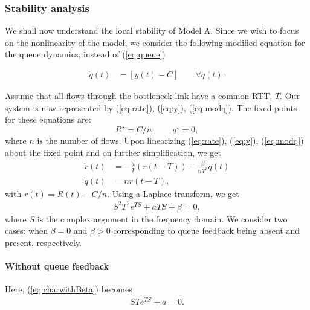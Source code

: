 \documentclass[conference]{IEEEtran}
\begin{document}
\subsubsection{Stability analysis}
We shall now understand the local stability of Model A. Since we wish to focus on the nonlinearity
of the model, we consider the following modified equation for the queue dynamics, instead of (\ref{eq:queue})

\begin{equation}
\label{eq:modq}
\begin{aligned}
\dot{q}\left(t\right) & = \left[y\left(t\right) - C\right] \qquad \forall q\left(t\right).
\end{aligned}
\end{equation}

Assume that all flows through the bottleneck link have a common RTT, $T$. Our system 
is now represented by (\ref{eq:rate}), (\ref{eq:y}), (\ref{eq:modq}). The fixed points for these equations are: 
\begin{equation}
\label{eq:fixedpts}
R^{\star} = C/n,\qquad q^{\star} = 0,
\end{equation}
where $n$ is the number of flows. Upon linearizing (\ref{eq:rate}), (\ref{eq:y}), 
(\ref{eq:modq}) about the fixed point and on further simplification, we get
\begin{equation}
\begin{aligned}
\label{eq:linear}
\dot{r}\left(t\right) &= -\frac{a}{T}\left(r\left(t-T\right)\right)-\frac{\beta}{nT^{2}}q\left(t\right)\\
\dot{q}\left(t\right) &= nr\left(t-T\right),
\end{aligned}
\end{equation}
with $r\left(t\right) = R\left(t\right) - C/n$. Using a Laplace transform, we get
\begin{equation}
\label{eq:charwithBeta}
\begin{aligned}
S^{2}T^{2}e^{TS} + aTS + \beta = 0,
\end{aligned}
\end{equation}
where $S$ is the complex argument in the frequency domain. We consider two cases: when $\beta =0$ and $\beta > 0$ corresponding to queue feedback being absent and present, respectively.

\paragraph{Without queue feedback}
Here, (\ref{eq:charwithBeta}) becomes
\begin{equation}
\label{eq:charwithoutBeta}
\begin{aligned}
STe^{TS} + a = 0.
\end{aligned}
\end{equation}
\end{document}
